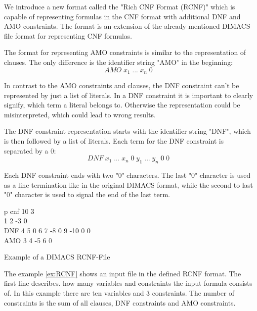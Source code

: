 We introduce a new format called the "Rich CNF Format (RCNF)" which is capable of representing formulas in the CNF format with additional DNF and AMO constraints. The format is an extension of the already mentioned DIMACS file format for representing CNF formulas.

\begin{leftbar}
The format for representing AMO constraints is similar to the representation of clauses. The only difference is the identifier string "AMO" in the beginning:
\begin{displaymath}
AMO \; x_1 \; ... \; x_n \; 0
\end{displaymath}
\end{leftbar}

In contrast to the AMO constraints and clauses, the DNF constraint can't be represented by just a list of literals. In a DNF constraint it is important to clearly signify, which term a literal belongs to. Otherwise the representation could be misinterpreted, which could lead to wrong results.

\begin{leftbar}
The DNF constraint representation starts with the identifier string "DNF", which is then followed by a list of literals. Each term for the DNF constraint is separated by a 0:
\begin{displaymath}
DNF \; x_1 \; ... \; x_n \; 0 \; y_1 \; ... \; y_n \; 0 \; 0
\end{displaymath}
\end{leftbar}

Each DNF constraint ends with two "0" characters. The last "0" character is used as a line termination like in the original DIMACS format, while the second to last "0" character is used to signal the end of the last term.

\begin{example}[!htb]
\begin{leftbar}
\begin{center}
p cnf 10 3 \\
1 2 -3 0 \\
DNF 4 5 0 6 7 -8 0 9 -10 0 0\\
AMO 3 4 -5 6 0
\end{center}
\end{leftbar}
\caption{Example of a DIMACS RCNF-File}
\label{ex:RCNF}
\end{example}

The example \ref{ex:RCNF} shows an input file in the defined RCNF format. The first line describes. how many variables and constraints the input formula consists of. In this example there are ten variables and 3 constraints. The number of constraints is the sum of all clauses, DNF constraints and AMO constraints.

